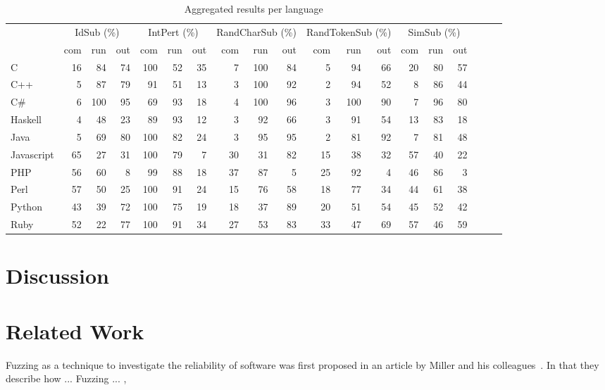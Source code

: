 \documentclass[10pt]{sigplanconf}
\begin{document}
\begin{table*}
\begin{center}
\caption{Aggregated results per language}
\label{tbl:aggregated-per-language}
\begin{tabular}{ l r r r r r r r r r r r r r r r r r r }
 \hline
 & \multicolumn{3}{c}{IdSub (\%)} & \multicolumn{3}{c}{IntPert (\%)} & \multicolumn{3}{c}{RandCharSub (\%)} & \multicolumn{3}{c}{RandTokenSub (\%)} & \multicolumn{3}{c}{SimSub (\%)}\\
 & com & run & out & com & run & out & com & run & out & com & run & out & com & run & out\\
\hline
C & 16 & 84 & 74 & 100 & 52 & 35 & 7 & 100 & 84 & 5 & 94 & 66 & 20 & 80 & 57 \\
C++ & 5 & 87 & 79 & 91 & 51 & 13 & 3 & 100 & 92 & 2 & 94 & 52 & 8 & 86 & 44 \\
C\# & 6 & 100 & 95 & 69 & 93 & 18 & 4 & 100 & 96 & 3 & 100 & 90 & 7 & 96 & 80 \\
Haskell & 4 & 48 & 23 & 89 & 93 & 12 & 3 & 92 & 66 & 3 & 91 & 54 & 13 & 83 & 18 \\
Java & 5 & 69 & 80 & 100 & 82 & 24 & 3 & 95 & 95 & 2 & 81 & 92 & 7 & 81 & 48 \\
Javascript & 65 & 27 & 31 & 100 & 79 & 7 & 30 & 31 & 82 & 15 & 38 & 32 & 57 & 40 & 22 \\
PHP & 56 & 60 & 8 & 99 & 88 & 18 & 37 & 87 & 5 & 25 & 92 & 4 & 46 & 86 & 3 \\
Perl & 57 & 50 & 25 & 100 & 91 & 24 & 15 & 76 & 58 & 18 & 77 & 34 & 44 & 61 & 38 \\
Python & 43 & 39 & 72 & 100 & 75 & 19 & 18 & 37 & 89 & 20 & 51 & 54 & 45 & 52 & 42 \\
Ruby & 52 & 22 & 77 & 100 & 91 & 34 & 27 & 53 & 83 & 33 & 47 & 69 & 57 & 46 & 59 \\
\hline
\end{tabular}
\end{center}
\end{table*}

\section{Discussion} %

\section{Related Work} %

Fuzzing as a technique to investigate the reliability of software
was first proposed in an article by Miller and his colleagues~\cite{MFS90}.
In that they describe how ... %
Fuzzing ... \cite{TJC08}, \cite{WWGZ11}
\end{document}
